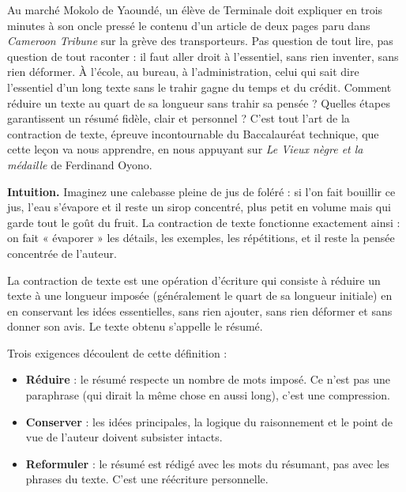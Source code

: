 \documentclass[11pt]{article}
\newcommand{\cle}[1]{{\popxbold\color{popdark}#1}}
\newcounter{popsec}
\newcounter{popsub}
\newcommand{\courssub}[1]{%
  \stepcounter{popsub}%
  \par\vspace{9pt}\noindent{\popxbold\fontsize{11.5}{13}\selectfont\color{popink}{\color{poporange}\thepopsec.\thepopsub}\hspace{6pt}#1}\par\nopagebreak\vspace{4pt}
}
\begin{document}
Au marché Mokolo de Yaoundé, un élève de Terminale doit expliquer en trois minutes à son oncle pressé le contenu d'un article de deux pages paru dans \emph{Cameroon Tribune} sur la grève des transporteurs. Pas question de tout lire, pas question de tout raconter : il faut aller droit à l'essentiel, sans rien inventer, sans rien déformer. À l'école, au bureau, à l'administration, celui qui sait dire l'essentiel d'un long texte sans le trahir gagne du temps et du crédit. Comment réduire un texte au quart de sa longueur sans trahir sa pensée ? Quelles étapes garantissent un résumé fidèle, clair et personnel ? C'est tout l'art de la \cle{contraction de texte}, épreuve incontournable du Baccalauréat technique, que cette leçon va nous apprendre, en nous appuyant sur \emph{Le Vieux nègre et la médaille} de Ferdinand Oyono.

\courssub{Définition de la contraction de texte}

\textbf{Intuition.} Imaginez une calebasse pleine de jus de foléré : si l'on fait bouillir ce jus, l'eau s'évapore et il reste un sirop concentré, plus petit en volume mais qui garde tout le goût du fruit. La contraction de texte fonctionne exactement ainsi : on fait « évaporer » les détails, les exemples, les répétitions, et il reste la pensée concentrée de l'auteur.

\begin{definition}
La \cle{contraction de texte} est une opération d'écriture qui consiste à réduire un texte à une longueur imposée (généralement le \cle{quart} de sa longueur initiale) en en conservant les \cle{idées essentielles}, sans rien ajouter, sans rien déformer et sans donner son avis. Le texte obtenu s'appelle le \cle{résumé}.
\end{definition}

Trois exigences découlent de cette définition :

\begin{itemize}
\item \textbf{Réduire} : le résumé respecte un nombre de mots imposé. Ce n'est pas une paraphrase (qui dirait la même chose en aussi long), c'est une compression.
\item \textbf{Conserver} : les idées principales, la logique du raisonnement et le point de vue de l'auteur doivent subsister intacts.
\item \textbf{Reformuler} : le résumé est rédigé avec les mots du résumant, pas avec les phrases du texte. C'est une réécriture personnelle.
\end{itemize}
\end{document}
